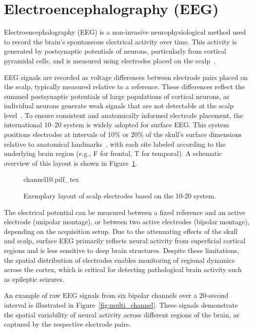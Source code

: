 \section{Electroencephalography (EEG)}
Electroencephalography (EEG) is a non-invasive neurophysiological method used to record the brain’s spontaneous electrical activity over time. This activity is generated by postsynaptic potentials of neurons, particularly from cortical pyramidal cells, and is measured using electrodes placed on the scalp~\cite{niedermeyer2005}.

EEG signals are recorded as voltage differences between electrode pairs placed on the scalp, typically measured relative to a reference. These differences reflect the summed postsynaptic potentials of large populations of cortical neurons, as individual neurons generate weak signals that are not detectable at the scalp level~\cite{niedermeyer2005}. To ensure consistent and anatomically informed electrode placement, the international 10–20 system is widely adopted for surface EEG. This system positions electrodes at intervals of 10\% or 20\% of the skull’s surface dimensions relative to anatomical landmarks~\cite{jurcak2007}, with each site labeled according to the underlying brain region (e.g., F for frontal, T for temporal). A schematic overview of this layout is shown in Figure~\ref{fig:electrodemap}.

\begin{figure}[h!]
	\centering
    \def\svgwidth{320pt}
    \fontsize{8pt}{8pt}
 	{channel10.pdf_tex} 	 	
	\caption[EEG 10-20 electrode map]{Exemplary layout of scalp electrodes based on the 10-20 system.}
	\label{fig:electrodemap}
\end{figure}

The electrical potential can be measured between a fixed reference and an active electrode (unipolar montage), or between two active electrodes (bipolar montage), depending on the acquisition setup. Due to the attenuating effects of the skull and scalp, surface EEG primarily reflects neural activity from superficial cortical regions and is less sensitive to deep brain structures. Despite these limitations, the spatial distribution of electrodes enables monitoring of regional dynamics across the cortex, which is critical for detecting pathological brain activity such as epileptic seizures.

An example of raw EEG signals from six bipolar channels over a 20-second interval is illustrated in Figure~\ref{fig:multi_channel}. These signals demonstrate the spatial variability of neural activity across different regions of the brain, as captured by the respective electrode pairs.

